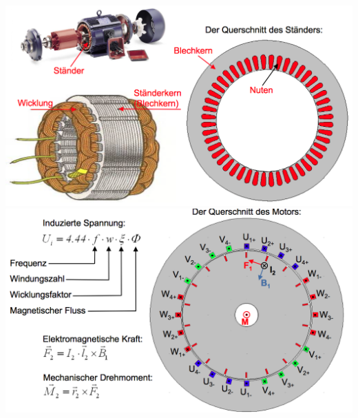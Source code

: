 \begin{minipage}{0.4 \linewidth}
\includegraphics[width = \linewidth]{./Pics/VL1213/Aufbau2}
\includegraphics[width = \linewidth]{./Pics/VL1213/Aufbau4}
\end{minipage}

